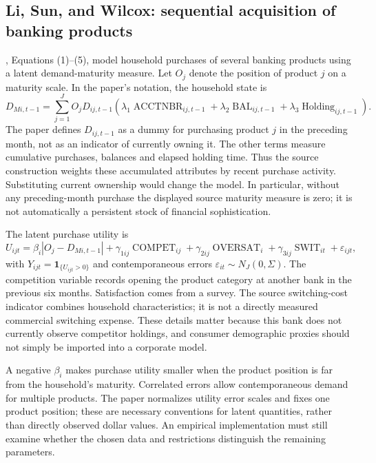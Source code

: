 \subsection{Li, Sun, and Wilcox: sequential acquisition of banking products}

\citet{li2005cross}, Equations (1)--(5), model household purchases of several banking products using a latent demand-maturity measure. Let $O_j$ denote the position of product $j$ on a maturity scale. In the paper's notation, the household state is
\begin{equation}
 D_{Mi,t-1}=\sum_{j=1}^J O_jD_{ij,t-1}
 \left(\lambda_1\operatorname{ACCTNBR}_{ij,t-1}
      +\lambda_2\operatorname{BAL}_{ij,t-1}
      +\lambda_3\operatorname{Holding}_{ij,t-1}\right).
 \label{eq:li-maturity}
\end{equation}
The paper defines $D_{ij,t-1}$ as a dummy for purchasing product $j$ in the preceding month, not as an indicator of currently owning it. The other terms measure cumulative purchases, balances and elapsed holding time. Thus the source construction weights these accumulated attributes by recent purchase activity. Substituting current ownership would change the model. In particular, without any preceding-month purchase the displayed source maturity measure is zero; it is not automatically a persistent stock of financial sophistication.

The latent purchase utility is
\begin{equation}
 U_{ijt}=\beta_i|O_j-D_{Mi,t-1}|+\gamma_{1ij}\operatorname{COMPET}_{ij}
  +\gamma_{2ij}\operatorname{OVERSAT}_i
  +\gamma_{3ij}\operatorname{SWIT}_{it}+\varepsilon_{ijt},
 \label{eq:li-utility}
\end{equation}
with $Y_{ijt}=\mathbf1_{\{U_{ijt}>0\}}$ and contemporaneous errors $\varepsilon_{it}\sim N_J(0,\Sigma)$. The competition variable records opening the product category at another bank in the previous six months. Satisfaction comes from a survey. The source switching-cost indicator combines household characteristics; it is not a directly measured commercial switching expense. These details matter because this bank does not currently observe competitor holdings, and consumer demographic proxies should not simply be imported into a corporate model.

A negative $\beta_i$ makes purchase utility smaller when the product position is far from the household's maturity. Correlated errors allow contemporaneous demand for multiple products. The paper normalizes utility error scales and fixes one product position; these are necessary conventions for latent quantities, rather than directly observed dollar values. An empirical implementation must still examine whether the chosen data and restrictions distinguish the remaining parameters.

